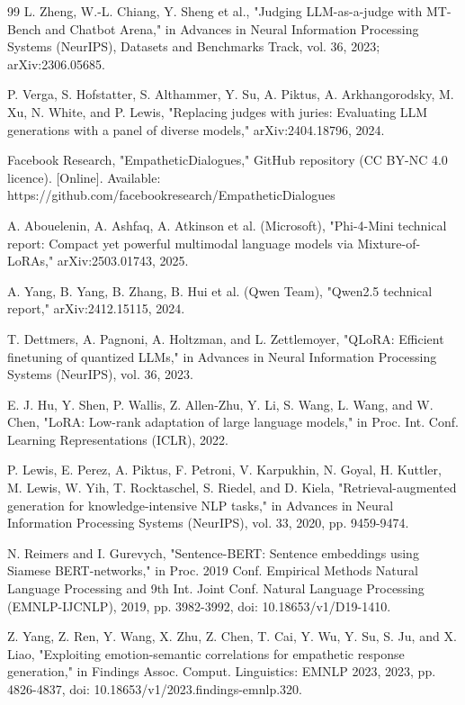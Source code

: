 \begin{thebibliography}{99}
L. Zheng, W.-L. Chiang, Y. Sheng et al., "Judging LLM-as-a-judge with MT-Bench and Chatbot Arena," in Advances in Neural Information Processing Systems (NeurIPS), Datasets and Benchmarks Track, vol. 36, 2023; arXiv:2306.05685.

P. Verga, S. Hofstatter, S. Althammer, Y. Su, A. Piktus, A. Arkhangorodsky, M. Xu, N. White, and P. Lewis, "Replacing judges with juries: Evaluating LLM generations with a panel of diverse models," arXiv:2404.18796, 2024.

Facebook Research, "EmpatheticDialogues," GitHub repository (CC BY-NC 4.0 licence). [Online]. Available: https://github.com/facebookresearch/EmpatheticDialogues

A. Abouelenin, A. Ashfaq, A. Atkinson et al. (Microsoft), "Phi-4-Mini technical report: Compact yet powerful multimodal language models via Mixture-of-LoRAs," arXiv:2503.01743, 2025.

A. Yang, B. Yang, B. Zhang, B. Hui et al. (Qwen Team), "Qwen2.5 technical report," arXiv:2412.15115, 2024.

T. Dettmers, A. Pagnoni, A. Holtzman, and L. Zettlemoyer, "QLoRA: Efficient finetuning of quantized LLMs," in Advances in Neural Information Processing Systems (NeurIPS), vol. 36, 2023.

E. J. Hu, Y. Shen, P. Wallis, Z. Allen-Zhu, Y. Li, S. Wang, L. Wang, and W. Chen, "LoRA: Low-rank adaptation of large language models," in Proc. Int. Conf. Learning Representations (ICLR), 2022.

P. Lewis, E. Perez, A. Piktus, F. Petroni, V. Karpukhin, N. Goyal, H. Kuttler, M. Lewis, W. Yih, T. Rocktaschel, S. Riedel, and D. Kiela, "Retrieval-augmented generation for knowledge-intensive NLP tasks," in Advances in Neural Information Processing Systems (NeurIPS), vol. 33, 2020, pp. 9459-9474.

N. Reimers and I. Gurevych, "Sentence-BERT: Sentence embeddings using Siamese BERT-networks," in Proc. 2019 Conf. Empirical Methods Natural Language Processing and 9th Int. Joint Conf. Natural Language Processing (EMNLP-IJCNLP), 2019, pp. 3982-3992, doi: 10.18653/v1/D19-1410.

Z. Yang, Z. Ren, Y. Wang, X. Zhu, Z. Chen, T. Cai, Y. Wu, Y. Su, S. Ju, and X. Liao, "Exploiting emotion-semantic correlations for empathetic response generation," in Findings Assoc. Comput. Linguistics: EMNLP 2023, 2023, pp. 4826-4837, doi: 10.18653/v1/2023.findings-emnlp.320.


\end{thebibliography}
